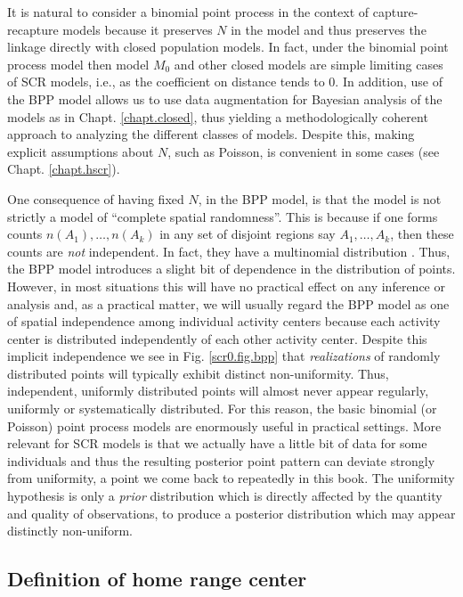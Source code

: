 It is natural to consider a binomial point process in the context of
capture-recapture models because it preserves $N$ in the model and thus
preserves the linkage directly with closed population models. In fact,
under the binomial point process model then model $M_0$ and other closed
models are simple limiting cases of SCR models, i.e., as the
coefficient on distance tends to 0.
In addition, use of
the BPP model allows us to use data augmentation for Bayesian analysis
of the models as in Chapt. \ref{chapt.closed}, thus yielding a methodologically
coherent approach to analyzing the different classes of
models. Despite this, making explicit assumptions about $N$, such as
Poisson, is convenient in some cases (see Chapt. \ref{chapt.hscr}).

One consequence of having fixed $N$, in the BPP model, is that the
model is not strictly a model of ``complete spatial randomness''. This
is because if one forms counts $n(A_{1}),\ldots, n(A_{k})$ in any set
of disjoint regions say $A_{1}, \ldots, A_{k}$, then these counts are
{\it not} independent.  In fact, they have a multinomial distribution
\citep[see][p. XYZ]{illian_etal:2008}. Thus, the BPP model introduces
a slight bit of dependence in the distribution of points. However, in
most situations this will have no practical effect on any inference or
analysis and, as a practical matter, we will usually regard the BPP
model as one of spatial independence among individual activity centers
because each activity center is distributed independently of each
other activity center. Despite this implicit independence we see in
Fig. \ref{scr0.fig.bpp} that {\it realizations} of randomly distributed
points will typically exhibit distinct non-uniformity. Thus,
independent, uniformly distributed points will almost never appear
regularly, uniformly or systematically distributed. For this reason,
the basic binomial (or Poisson) point process models are enormously
useful in practical settings.  More relevant for SCR models is that we
actually have a little bit of data for some individuals and thus the
resulting posterior point pattern can deviate strongly from
uniformity, a point we come back to repeatedly in this book.
The uniformity hypothesis is only
a {\it prior} distribution which is directly affected by the quantity
and quality of observations, to produce a posterior distribution which
may appear distinctly non-uniform.


\subsection{Definition of home range center}

